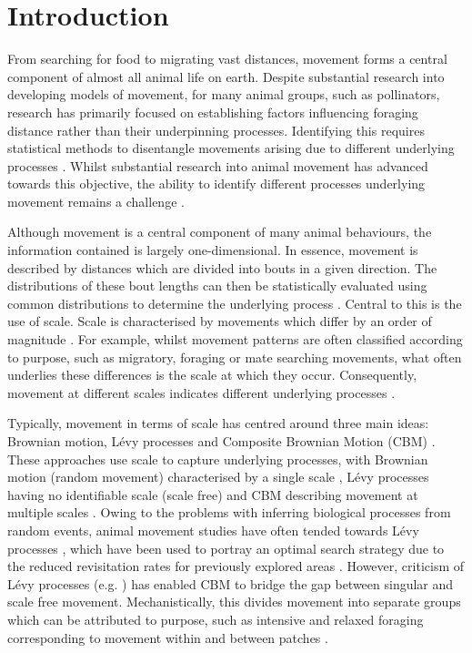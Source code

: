 \documentclass[11pt,usenames,dvipsnames,a4paper]{article}
\begin{document}
\section{Introduction}

\begin{linenumbers}
\hspace{\parindent}
From searching for food to migrating vast distances, movement forms a central component of almost all animal life on earth. Despite substantial research into developing models of movement, for many animal groups, such as pollinators, research has primarily focused on establishing factors influencing foraging distance \citep{Beekman2000, Hagler2011, Couvillon2015a} rather than their underpinning processes. Identifying this requires statistical methods to disentangle movements arising due to different underlying processes \citep{Nathan2008}. Whilst substantial research into animal movement has advanced towards this objective, the ability to identify different processes underlying movement remains a challenge \citep{Patterson2017}. 

Although movement is a central component of many animal behaviours, the information contained is largely one-dimensional. In essence, movement is described by distances which are divided into bouts in a given direction. The distributions of these bout lengths can then be statistically evaluated using common distributions to determine the underlying process \citep{Murphy2007, Reynolds2018}. Central to this is the use of scale. Scale is characterised by movements which differ by an order of magnitude \citep{Levin1992}. For example, whilst movement patterns are often classified according to purpose, such as migratory, foraging or mate searching movements, what often underlies these differences is the scale at which they occur. Consequently, movement at different scales indicates different underlying processes \citep{Nathan2008}. 

Typically, movement in terms of scale has centred around three main ideas: Brownian motion, L\'evy processes and Composite Brownian Motion (CBM) \citep{Nathan2008, Reynolds2018}. These approaches use scale to capture underlying processes, with Brownian motion (random movement) characterised by a single scale \citep{Barthelemy2008}, L\'evy processes having no identifiable scale (scale free) \citep{Viswanathan1999, Barthelemy2008, Reynolds2018} and CBM describing movement at multiple scales \citep{Petrovskii2011, Jansen2012}. Owing to the problems with inferring biological processes from random events, animal movement studies have often tended towards L\'evy processes \citep{Viswanathan1999, Ayala-Orozco2004, Boyer, Sims2008, Humphries2010, Harris2012, Baronchelli2013, Ariel2015}, which have been used to portray an optimal search strategy due to the reduced revisitation rates for previously explored areas \citep{Viswanathan1999, Humphries2014}. However, criticism of L\'evy processes (e.g. \cite{Pyke2015}) has enabled CBM to bridge the gap between singular and scale free movement. Mechanistically, this divides movement into separate groups which can be attributed to purpose, such as intensive and relaxed foraging corresponding to movement within and between patches \citep{Auger-Methe2015}. 


\end{linenumbers}
\end{document}
